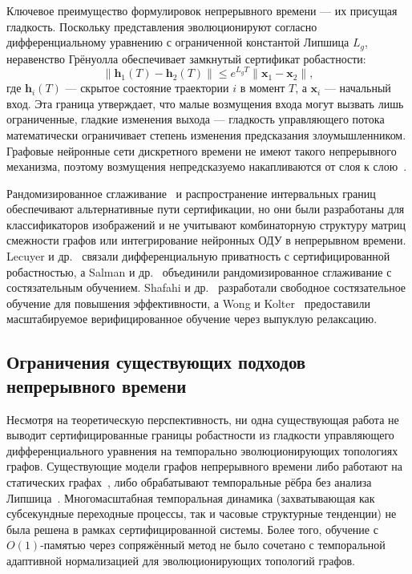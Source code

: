 Ключевое преимущество формулировок непрерывного времени --- их присущая гладкость. Поскольку представления эволюционируют согласно дифференциальному уравнению с ограниченной константой Липшица $L_g$, неравенство Грёнуолла обеспечивает замкнутый сертификат робастности:
\begin{equation}
\|\mathbf{h}_1(T) - \mathbf{h}_2(T)\| \leq e^{L_g T}\|\mathbf{x}_1 - \mathbf{x}_2\|,
\label{eq:ch1_gronwall}
\end{equation}
где $\mathbf{h}_i(T)$ --- скрытое состояние траектории $i$ в момент $T$, а $\mathbf{x}_i$ --- начальный вход. Эта граница утверждает, что малые возмущения входа могут вызвать лишь ограниченные, гладкие изменения выхода --- гладкость управляющего потока математически ограничивает степень изменения предсказания злоумышленником. Графовые нейронные сети дискретного времени не имеют такого непрерывного механизма, поэтому возмущения непредсказуемо накапливаются от слоя к слою~\cite{Zhao2023hamilton}.

Рандомизированное сглаживание~\cite{Cohen2019} и распространение интервальных границ~\cite{Gowal2019} обеспечивают альтернативные пути сертификации, но они были разработаны для классификаторов изображений и не учитывают комбинаторную структуру матриц смежности графов или интегрирование нейронных ОДУ в непрерывном времени. Lecuyer и др.~\cite{Lecuyer2019} связали дифференциальную приватность с сертифицированной робастностью, а Salman и др.~\cite{Salman2019} объединили рандомизированное сглаживание с состязательным обучением. Shafahi и др.~\cite{Shafahi2019} разработали свободное состязательное обучение для повышения эффективности, а Wong и Kolter~\cite{Wong2020} предоставили масштабируемое верифицированное обучение через выпуклую релаксацию.


\subsection{Ограничения существующих подходов непрерывного времени}

Несмотря на теоретическую перспективность, ни одна существующая работа не выводит сертифицированные границы робастности из гладкости управляющего дифференциального уравнения на темпорально эволюционирующих топологиях графов. Существующие модели графов непрерывного времени либо работают на статических графах~\cite{Chamberlain2021}, либо обрабатывают темпоральные рёбра без анализа Липшица~\cite{Xu2020tgat,Rossi2020,Pei2020tgn,Kazemi2020,Wang2021tedic}. Многомасштабная темпоральная динамика (захватывающая как субсекундные переходные процессы, так и часовые структурные тенденции) не была решена в рамках сертифицированной системы. Более того, обучение с $O(1)$-памятью через сопряжённый метод не было сочетано с темпоральной адаптивной нормализацией для эволюционирующих топологий графов.

